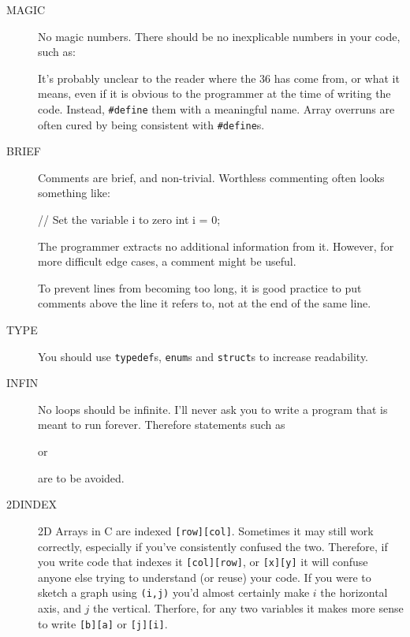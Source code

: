 \begin{description}
\item[MAGIC] No magic numbers. There should be no inexplicable numbers in your code, such
as:
\begin{codesnippet}
	if(i < 36){
\end{codesnippet}

It's probably unclear to the reader where the $36$ has come from, or what it means,
even if it is obvious to the programmer at the time of writing the code. Instead,
\verb^#define^ them with a meaningful name.
Array overruns are often cured by being consistent with \verb^#define^s.

\item[BRIEF] Comments are brief, and non-trivial. Worthless commenting often
looks something like:
\begin{codesnippet}
// Set the variable i to zero
int i = 0;
\end{codesnippet}
The programmer extracts no additional information from it. However, for more
difficult edge cases, a comment might be useful.
\begin{codesnippet}
// Have we reached the end of the list ?
if(t1->h == NULL){ 
\end{codesnippet}

\noindent To prevent lines from becoming too long, it is good practice to put comments above
the line it refers to, not at the end of the same line.

\item[TYPE] You should use \verb^typedef^s, \verb^enum^s and \verb^struct^s to
increase readability. 

\item[INFIN] No loops should be infinite. I'll never ask you to write a program that is meant to run forever. Therefore statements such as
\begin{codesnippet}
while(1){
\end{codesnippet}
or
\begin{codesnippet}
for(;;;){
\end{codesnippet}
are to be avoided.

\item[2DINDEX] 2D Arrays in C are indexed \verb^[row][col]^.  Sometimes
it may still work correctly, especially if you've consistently confused
the two.  Therefore, if you write code that indexes it \verb^[col][row]^,
or \verb^[x][y]^ it will confuse anyone else trying to understand (or
reuse) your code. If you were to sketch a graph using \verb^(i,j)^ you'd
almost certainly make $i$ the horizontal axis, and $j$ the vertical.
Therfore, for any two variables it makes more sense to write \verb^[b][a]^
or \verb^[j][i]^.

\end{description}
